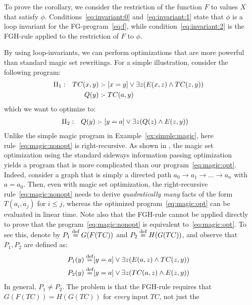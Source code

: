 To prove the corollary, we consider the restriction of the function
$F$ to values $X$ that satisfy $\phi$.
Conditions~\eqref{eq:invariant:0} and~\eqref{eq:invariant:1} state
that $\phi$ is a loop invariant for the FG-program~\eqref{eq:f}, while
condition~\eqref{eq:invariant:2} is the FGH-rule applied to the
restriction of $F$ to $\phi$.

\begin{ex} \label{ex:more:magic} By using
  loop-invariants, we can perform optimizations that are more powerful
  than standard magic set rewritings.
%
  For a simple illustration, consider the following program:
%
\begin{align}
\Pi_1: &&  TC(x,y) \text{ :- } & [x=y] \vee \exists z(E(x,z) \wedge TC(z,y))\label{eq:magic:nonopt}\\
      &&  Q(y) \text{ :- } & TC(a,y) \nonumber
\end{align}
%
which we want to optimize to:
%
\begin{align}
\Pi_2: &&  Q(y) \text{ :- } & [y=a] \vee \exists z(Q(z) \wedge E(z,y)) \label{eq:magic:opt}
\end{align}
%
Unlike the simple magic program in Example~\ref{ex:simple:magic}, here
rule~\eqref{eq:magic:nonopt} is right-recursive.  As shown in
\cite{DBLP:journals/jlp/BeeriR91}, the magic set optimization using
the standard sideways information passing
optimization~\cite{DBLP:books/aw/AbiteboulHV95} yields a program that
is more complicated than our program~\eqref{eq:magic:opt}.  Indeed,
consider a graph that is simply a directed path
$a_0 \rightarrow a_1 \rightarrow \dots \rightarrow a_n$ with
$a = a_0$.  Then, even with magic set optimization, the
right-recursive rule~\eqref{eq:magic:nonopt} needs to derive {\em
  quadratically many\/} facts of the form $T(a_i, a_j)$ for
$i \leq j$, whereas the optimized program~\eqref{eq:magic:opt} can be
evaluated in linear time.  Note also that the FGH-rule cannot be
applied directly to prove that the program~\eqref{eq:magic:nonopt} is
equivalent to~\eqref{eq:magic:opt}.  To see this, denote by
$P_1 \stackrel{\text{def}}{=} G(F(TC))$ and $P_2 \stackrel{\text{def}}{=} H(G(TC))$, and observe that
$P_1, P_2$ are defined as:
%
\begin{align*}
  P_1(y) \stackrel{\text{def}}{=} & [y=a] \vee \exists z(E(a,z) \wedge TC(z,y)) \\
  P_2(y) \stackrel{\text{def}}{=} & [y=a] \vee \exists z(TC(a,z) \wedge E(z,y))
\end{align*}
%
In general, $P_1 \neq P_2$.  The problem is that the FGH-rule requires
that $G(F(TC))=H(G(TC))$ for {\em every} input $TC$, not just the

\end{ex}
